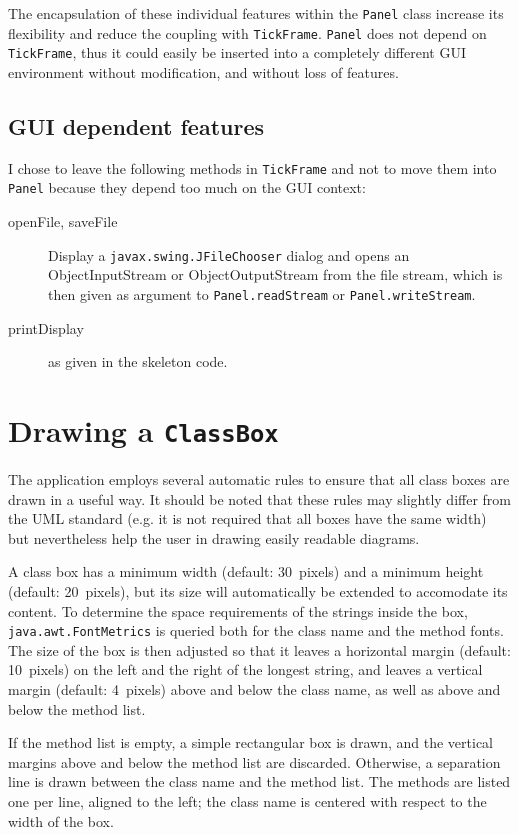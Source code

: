 \documentclass[11pt]{article}
\begin{document}
The encapsulation of these individual features within the {\tt Panel} class
increase its flexibility and reduce the coupling with {\tt TickFrame}.
{\tt Panel} does not depend on {\tt TickFrame}, thus it could easily be
inserted into a completely different GUI environment without modification,
and without loss of features.

\subsection{GUI dependent features}
I chose to leave the following methods in {\tt TickFrame} and not to move them
into {\tt Panel} because they depend too much on the GUI context:

\begin{description}
\item[openFile, saveFile] Display a {\tt javax.swing.JFileChooser} dialog
    and opens an ObjectInputStream or ObjectOutputStream from the file stream,
    which is then given as argument to {\tt Panel.read\-Stream} or
    {\tt Panel.write\-Stream}.
\item[printDisplay] as given in the skeleton code.
\end{description}

\section{Drawing a {\tt ClassBox}}

The application employs several automatic rules to ensure that all class boxes
are drawn in a useful way. It should be noted that these rules may slightly
differ from the UML standard (e.g. it is not required that all boxes have the
same width) but nevertheless help the user in drawing easily readable
diagrams.

A class box has a minimum width (default: 30~pixels) and a minimum height
(default: 20~pixels), but its size will automatically be extended to accomodate
its content. To determine the space requirements of the strings inside the
box, {\tt java.awt.FontMetrics} is queried both for the class name and the
method fonts. The size of the box is then adjusted so that it leaves a
horizontal margin (default: 10~pixels) on the left and the right of the longest
string, and leaves a vertical margin (default: 4~pixels) above and below the
class name, as well as above and below the method list.

If the method list is empty, a simple rectangular box is drawn, and the vertical
margins above and below the method list are discarded. Otherwise, a separation
line is drawn between the class name and the method list. The methods are
listed one per line, aligned to the left; the class name is centered with
respect to the width of the box.
\end{document}
